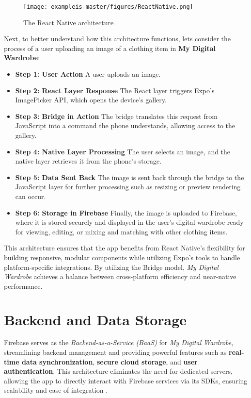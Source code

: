 \begin{figure}[h]
    \centering
    \texttt{[image: exampleis-master/figures/ReactNative.png]}
    \caption{The React Native  architecture \cite{react_native_arch} }
    \label{fig:react_native_architecture}
\end{figure}


Next, to better understand how this architecture functions, lets consider the process of a user uploading an image of a clothing item in \textbf{ My Digital Wardrobe}:

\begin{itemize}
    \item \textbf{Step 1: User Action }A user uploads an image.
    \item \textbf{Step 2: React Layer Response }The React layer triggers Expo’s ImagePicker API, which opens the device’s gallery.
    \item \textbf{Step 3: Bridge in Action }The bridge translates this request from JavaScript into a command the phone understands, allowing access to the gallery.
    \item \textbf{Step 4: Native Layer Processing }The user selects an image, and the native layer retrieves it from the phone’s storage.
    \item \textbf{Step 5: Data Sent Back }The image is sent back through the bridge to the JavaScript layer for further processing such as resizing or preview rendering can occur.
    \item \textbf{Step 6: Storage in Firebase }Finally, the image is uploaded to Firebase, where it is stored securely and displayed in the user’s digital wardrobe ready for viewing, editing, or mixing and matching with other clothing items.
    
\end{itemize}


This architecture ensures that the app benefits from React Native's flexibility for building responsive, modular components while utilizing Expo's tools to handle platform-specific integrations. By utilizing the Bridge model, \textit{My Digital Wardrobe} achieves a balance between cross-platform efficiency and near-native performance.

\section{Backend and Data Storage}

Firebase serves as the \textit{Backend-as-a-Service (BaaS)} for \textit{My Digital Wardrobe}, streamlining backend management and providing powerful features such as \textbf{real-time data synchronization}, \textbf{secure cloud storage}, and \textbf{user authentication}. This architecture eliminates the need for dedicated servers, allowing the app to directly interact with Firebase services via its SDKs, ensuring scalability and ease of integration \cite{firebase_intro}.

